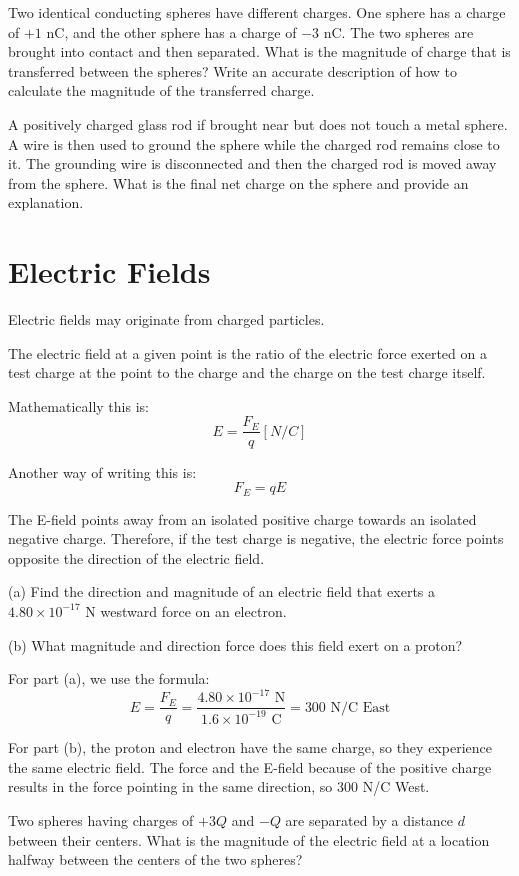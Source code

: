\documentclass[../em.tex]{subfiles}
\begin{document}
\ex Two identical conducting spheres have different charges. One sphere has a charge of $+1$ nC, and the other sphere has a charge of $-3$ nC. 
The two spheres are brought into contact and then separated. What is the magnitude of charge that is transferred between the spheres? 
Write an accurate description of how to calculate the magnitude of the transferred charge.

\ex A positively charged glass rod if brought near but does not touch a metal sphere. 
A wire is then used to ground the sphere while the charged rod remains close to it. The grounding wire is disconnected and then the charged 
rod is moved away from the sphere. What is the final net charge on the sphere and provide an explanation.

\section{Electric Fields}
Electric fields may originate from charged particles.

The electric field at a given point is the ratio of the electric force exerted on a test 
charge at the point to the charge and the charge on the test charge itself.

Mathematically this is:
\[E = \frac{F_E}{q}[N/C]\]

Another way of writing this is:
\[F_E=qE\]

The E-field points away from an isolated positive charge towards an 
isolated negative charge. Therefore, if the test charge is negative, 
the electric force points opposite the direction of the electric field.

\begin{example}
(a) Find the direction and magnitude of an electric field that exerts a $4.80\times10^{-17}$ N westward force on an electron. 

(b) What magnitude and direction force does this field exert on a proton?

For part (a), we use the formula:
\[E=\frac{F_E}{q}=\frac{4.80\times10^{-17}\text{ N}}{1.6\times10^{-19}\text{ C}}=300  \text{ N/C East}\]

For part (b), the proton and electron have the same charge, so they experience the same electric field. 
The force and the E-field because of the positive charge results in the force pointing in the same direction, so 300 N/C West.
\end{example}

\ex Two spheres having charges of $+3Q$ and $-Q$ are separated by a distance $d$ between their centers. What is the magnitude of the electric field at a location halfway between the centers of the two spheres?
\end{document}
